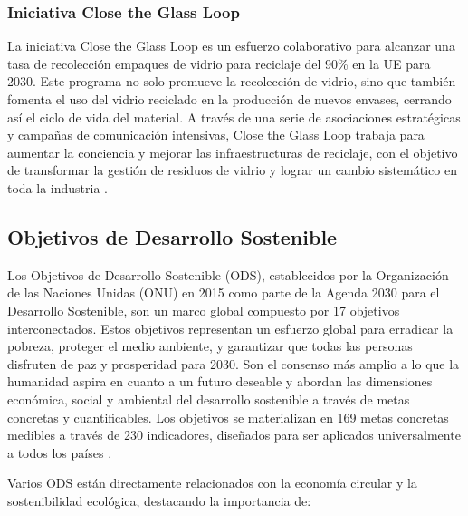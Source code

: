 \documentclass[main.tex]{subfiles}
\begin{document}
\subsubsection{Iniciativa Close the Glass Loop}
La iniciativa Close the Glass Loop es un esfuerzo colaborativo para alcanzar una tasa de recolección empaques de vidrio para reciclaje del 90\% en la UE para 2030. Este programa no solo promueve la recolección de vidrio, sino que también fomenta el uso del vidrio reciclado en la producción de nuevos envases, cerrando así el ciclo de vida del material. A través de una serie de asociaciones estratégicas y campañas de comunicación intensivas, Close the Glass Loop trabaja para aumentar la conciencia y mejorar las infraestructuras de reciclaje, con el objetivo de transformar la gestión de residuos de vidrio y lograr un cambio sistemático en toda la industria \cite{closetheglassloop2023}.

\subsection{Objetivos de Desarrollo Sostenible}
Los Objetivos de Desarrollo Sostenible (ODS), establecidos por la Organización de las Naciones Unidas (ONU) en 2015 como parte de la Agenda 2030 para el Desarrollo Sostenible, son un marco global compuesto por 17 objetivos interconectados. Estos objetivos representan un esfuerzo global para erradicar la pobreza, proteger el medio ambiente, y garantizar que todas las personas disfruten de paz y prosperidad para 2030. Son el consenso más amplio a lo que la humanidad aspira en cuanto a un futuro deseable y abordan las dimensiones económica, social y ambiental del desarrollo sostenible a través de metas concretas y cuantificables. Los objetivos se materializan en 169 metas concretas medibles a través de 230 indicadores, diseñados para ser aplicados universalmente a todos los países  \cite{onu2024ods gil2018objetivos}.

Varios ODS están directamente relacionados con la economía circular y la sostenibilidad ecológica, destacando la importancia de:
\end{document}
